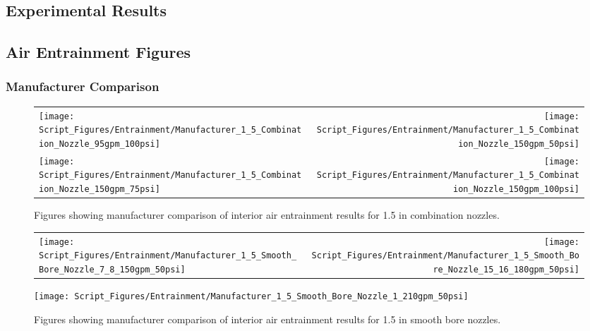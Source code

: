 \documentclass{article}
\begin{document}

\printbibliography

\clearpage

\begin{appendices}

\section{Experimental Results} \label{App:Results}
\renewcommand{\thesubsection}{\Alph{section}}

\appendix

\subsection{Air Entrainment Figures}
\label{app:Air_Entrainment_Figures}

\subsubsection{Manufacturer Comparison}

\begin{figure}[!ht]
\begin{tabular*}{\textwidth}{lr}
\texttt{[image: Script\_Figures/Entrainment/Manufacturer\_1\_5\_Combination\_Nozzle\_95gpm\_100psi]} &
\texttt{[image: Script\_Figures/Entrainment/Manufacturer\_1\_5\_Combination\_Nozzle\_150gpm\_50psi]} \\
\texttt{[image: Script\_Figures/Entrainment/Manufacturer\_1\_5\_Combination\_Nozzle\_150gpm\_75psi]} &
\texttt{[image: Script\_Figures/Entrainment/Manufacturer\_1\_5\_Combination\_Nozzle\_150gpm\_100psi]} \\
\end{tabular*}
\caption{Figures showing manufacturer comparison of interior air entrainment results for 1.5 in combination nozzles.}
\label{fig:1_5_Interior_Combination_Manufacturer}
\end{figure}

\clearpage

\begin{figure}[!ht]
\begin{tabular*}{\textwidth}{lr}
\texttt{[image: Script\_Figures/Entrainment/Manufacturer\_1\_5\_Smooth\_Bore\_Nozzle\_7\_8\_150gpm\_50psi]} &
\texttt{[image: Script\_Figures/Entrainment/Manufacturer\_1\_5\_Smooth\_Bore\_Nozzle\_15\_16\_180gpm\_50psi]} \\
\end{tabular*}
\centering
\texttt{[image: Script\_Figures/Entrainment/Manufacturer\_1\_5\_Smooth\_Bore\_Nozzle\_1\_210gpm\_50psi]} 
\caption{Figures showing manufacturer comparison of interior air entrainment results for 1.5 in smooth bore nozzles.}
\label{fig:1_5_Interior_Smooth_Bore_Manufacturer}
\end{figure}


\end{appendices}
\end{document}
